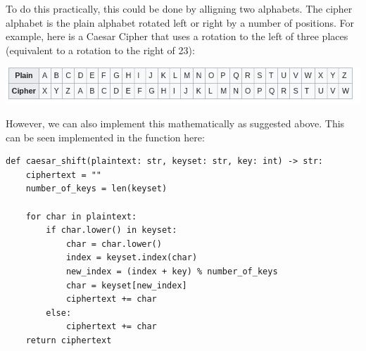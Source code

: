 \documentclass{article}
\begin{document}
To do this practically, this could be done by alligning two alphabets. The
cipher alphabet is the plain alphabet rotated left or right by a number of
positions. For example, here is a Caesar Cipher that uses a rotation to the
left of three places (equivalent to a rotation to the right of 23):
\medskip

\includegraphics[width = \textwidth]{Screenshot 2024-11-24 22.13.38.png}
\medskip

However, we can also implement this mathematically as suggested above.
This can be seen implemented in the function here:
\medskip
\begin{lstlisting}
def caesar_shift(plaintext: str, keyset: str, key: int) -> str:
    ciphertext = ""
    number_of_keys = len(keyset)

    for char in plaintext:
        if char.lower() in keyset:
            char = char.lower()
            index = keyset.index(char)
            new_index = (index + key) % number_of_keys
            char = keyset[new_index]
            ciphertext += char
        else:
            ciphertext += char
    return ciphertext
\end{lstlisting}
\medskip
\end{document}
